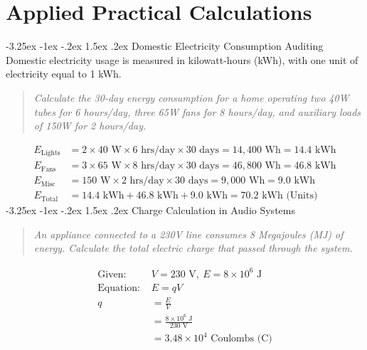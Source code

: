 \documentclass[11pt,a4paper]{report}
\makeatletter
\renewcommand{\section}{\@startsection{section}{1}{\z@}%
  {-3.25ex \@plus -1ex \@minus -.2ex}%
  {1.5ex \@plus.2ex}%
  {\normalfont\Large\bfseries\color{primaryColor}}}
\makeatother
\begin{document}
\chapter{Applied Practical Calculations}
\section{Domestic Electricity Consumption Auditing}
Domestic electricity usage is measured in kilowatt-hours (kWh), with one unit of electricity equal to 1 kWh.
\begin{quote}\textit{Calculate the 30-day energy consumption for a home operating two 40W tubes for 6 hours/day, three 65W fans for 8 hours/day, and auxiliary loads of 150W for 2 hours/day.}\end{quote}
\begin{align*}
E_{\text{Lights}} &= 2 \times 40\text{ W} \times 6\text{ hrs/day} \times 30\text{ days} = 14{,}400\text{ Wh} = 14.4\text{ kWh} \\
E_{\text{Fans}}   &= 3 \times 65\text{ W} \times 8\text{ hrs/day} \times 30\text{ days} = 46{,}800\text{ Wh} = 46.8\text{ kWh} \\
E_{\text{Misc}}   &= 150\text{ W} \times 2\text{ hrs/day} \times 30\text{ days} = 9{,}000\text{ Wh} = 9.0\text{ kWh} \\
E_{\text{Total}}  &= 14.4\text{ kWh} + 46.8\text{ kWh} + 9.0\text{ kWh} = 70.2\text{ kWh (Units)}
\end{align*}
\section{Charge Calculation in Audio Systems}
\begin{quote}\textit{An appliance connected to a 230V line consumes 8 Megajoules (MJ) of energy. Calculate the total electric charge that passed through the system.}\end{quote}
\begin{align*}
\text{Given: } &V = 230\text{ V}, \ E = 8 \times 10^6\text{ J} \\
\text{Equation: } &E = qV \\
q &= \frac{E}{V} \\
  &= \frac{8 \times 10^6\text{ J}}{230\text{ V}} \\
  &= 3.48 \times 10^4\text{ Coulombs (C)}
\end{align*}
\end{document}
